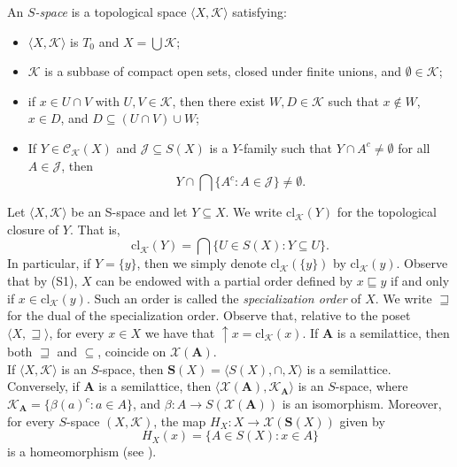 \documentclass{article}
\begin{document}
An \emph{$S$-space} \cite{CG} is a topological space $\langle X,\mathcal{K}\rangle$ satisfying:
\begin{itemize}
    \item[(S1)] $\langle X,\mathcal{K}\rangle$ is $T_0$ and $X = \bigcup \mathcal{K}$;
    \item[(S2)] $\mathcal{K}$ is a subbase of compact open sets, closed under finite unions, and $\emptyset \in \mathcal{K}$;
    \item[(S3)] if $x \in U \cap V$ with $U,V \in \mathcal{K}$, then there exist $W,D \in \mathcal{K}$ such that $x \notin W$, $x \in D$, and $D \subseteq (U \cap V)\cup W$;
   \item[(S4)] If $Y \in \mathcal{C}_{\mathcal{K}}(X)$ and $\mathcal{J} \subseteq S(X)$ is a $Y$-family such that $Y \cap A^c \neq \emptyset$ for all $A \in \mathcal{J}$, then 
\[
Y \cap \bigcap \{A^c : A \in \mathcal{J}\} \neq \emptyset.
\]
\end{itemize}

Let $\langle X, \mathcal{K}\rangle$ be an S-space and let $Y \subseteq X$. We write $\text{cl}_{\mathcal{K}}(Y)$ for the topological closure of $Y$. That is, 
\[\text{cl}_{\mathcal{K}}(Y)=\bigcap\{U \in S(X) \colon Y\subseteq U\}.\]
In particular, if $Y = \{y\}$, then we simply denote $\text{cl}_\mathcal{K}(\{y\})$ by $\text{cl}_\mathcal{K}(y)$. Observe that by (S1), $X$ can be endowed with a partial order defined by $x \sqsubseteq y$ if and only if $x \in \text{cl}_\mathcal{K}(y)$. Such an order is called the \emph{specialization order} of $X$. We write $\sqsupseteq$ for the dual of the specialization order. Observe that, relative to the poset $\langle X, \sqsupseteq\rangle$, for every $x\in X$ we have that $\uparrow x=\text{cl}_{\mathcal{K}}(x)$. If $\mathbf{A}$ is a semilattice, then both $\sqsupseteq$ and $\subseteq$, coincide on $\mathcal{X}(\mathbf{A})$. 
\\


If $\langle X,\mathcal{K}\rangle$ is an $S$-space, then $\mathbf{S}(X) = \langle S(X), \cap, X\rangle$ is a semilattice. Conversely, if $\mathbf{A}$ is a semilattice, then $\langle\mathcal{X}(\mathbf{A}), \mathcal{K}_{\mathbf{A}}\rangle$ is an $S$-space, where $\mathcal{K}_{\mathbf{A}} = \{\beta(a)^c : a \in A\}$, and $\beta \colon A \to S(\mathcal{X}(\mathbf{A}))$ is an isomorphism. Moreover, for every $S$-space $(X,\mathcal{K})$, the map $H_X \colon X \to \mathcal{X}(\mathbf{S}(X))$ given by
\begin{equation}\label{eq: H_X}
H_X(x) = \{A \in S(X) : x \in A\}    
\end{equation}
is a homeomorphism (see \cite{CG}).
\end{document}
